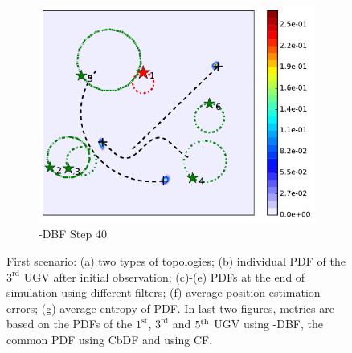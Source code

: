 \begin{figure}
\begin{subfigure}[b]{0.23\textwidth}
			\includegraphics[width=\textwidth]{figures/hetero_mov_sen_mov_tar_rbt1_step40}
			\caption{\proto-DBF Step 40}\label{fig:step40}
		\end{subfigure}	
		\caption{First scenario: (a) two types of topologies; (b) individual PDF of the $3^\text{rd}$ UGV after initial observation; (c)-(e) PDFs at the end of simulation using different filters; (f) average position estimation errors; (g) average entropy of PDF. In last two figures, metrics are based on the PDFs of the $1^\text{st}$, $3^\text{rd}$ and $5^\text{th}$ UGV using \proto-DBF, the common PDF using CbDF and using CF.}
		\label{fig:mov_sen_mov_tar1}
	\end{figure}
	
